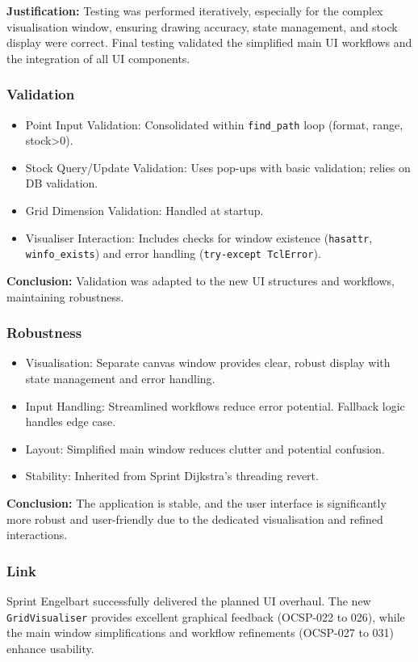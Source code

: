 \textbf{Justification:} Testing was performed iteratively, especially for the complex visualisation window, ensuring drawing accuracy, state management, and stock display were correct. Final testing validated the simplified main UI workflows and the integration of all UI components.

\newpage

\subsubsection{Validation}
\begin{itemize}
	\item Point Input Validation: Consolidated within \verb|find_path| loop (format, range, stock>0).
	\item Stock Query/Update Validation: Uses pop-ups with basic validation; relies on DB validation.
	\item Grid Dimension Validation: Handled at startup.
	\item Visualiser Interaction: Includes checks for window existence (\verb|hasattr|, \verb|winfo_exists|) and error handling (\verb|try-except TclError|).
\end{itemize}
\textbf{Conclusion:} Validation was adapted to the new UI structures and workflows, maintaining robustness.

\subsubsection{Robustness}
\begin{itemize}
	\item Visualisation: Separate canvas window provides clear, robust display with state management and error handling.
	\item Input Handling: Streamlined workflows reduce error potential. Fallback logic handles edge case.
	\item Layout: Simplified main window reduces clutter and potential confusion.
	\item Stability: Inherited from Sprint Dijkstra's threading revert.
\end{itemize}
\textbf{Conclusion:} The application is stable, and the user interface is significantly more robust and user-friendly due to the dedicated visualisation and refined interactions.

\subsubsection{Link}
Sprint Engelbart successfully delivered the planned UI overhaul. The new \verb|GridVisualiser| provides excellent graphical feedback (OCSP-022 to 026), while the main window simplifications and workflow refinements (OCSP-027 to 031) enhance usability.


